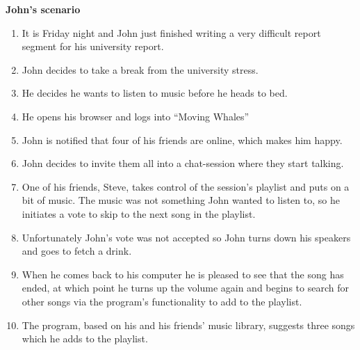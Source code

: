 \vspace{5 mm}
\textbf{John's scenario}
\begin{enumerate}
	\item It is Friday night and John just finished writing a very difficult report segment for his university report.
	\item John decides to take a break from the university stress.
	\item He decides he wants to listen to music before he heads to bed.
	\item He opens his browser and logs into ``Moving Whales''
	\item John is notified that four of his friends are online, which makes him happy.
	\item John decides to invite them all into a chat-session where they start talking.
	\item One of his friends, Steve, takes control of the session's playlist and puts on a bit of music. The music was not something John wanted to listen to, so he initiates a vote to skip to the next song in the playlist.
	\item Unfortunately John's vote was not accepted so John turns down his speakers and goes to fetch a drink.
	\item When he comes back to his computer he is pleased to see that the song has ended, at which point he turns up the volume again and begins to search for other songs via the program's functionality to add to the playlist.
	\item The program, based on his and his friends' music library, suggests three songs which he adds to the playlist.
\end{enumerate}